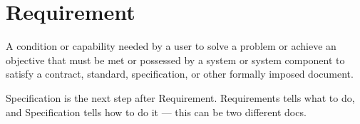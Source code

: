 \section{Requirement}
\label{sec:Requirement}

A condition or capability needed by a user to solve a problem or achieve an objective that must be met or possessed by a system or system component to satisfy a contract, standard, specification, or other formally imposed document.

Specification is the next step after Requirement. Requirements tells what to do, and Specification tells how to do it — this can be two different docs.